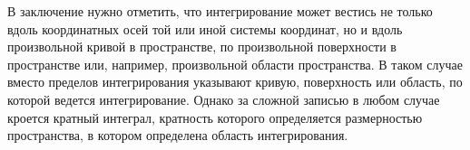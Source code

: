 В заключение нужно отметить, что интегрирование может вестись не только вдоль координатных осей той или иной системы координат, но и вдоль произвольной кривой в пространстве, по произвольной поверхности в пространстве или, например, произвольной области пространства. В таком случае вместо пределов интегрирования указывают кривую, поверхность или область, по которой ведется интегрирование. Однако за сложной записью в любом случае кроется кратный интеграл, кратность которого определяется размерностью пространства, в котором определена область интегрирования.
